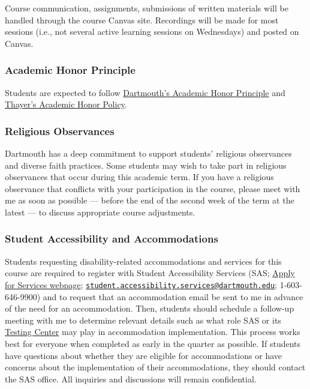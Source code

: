 \documentclass[
  11pt,
]{article}
\begin{document}
Course communication, assignments, submissions of written materials will
be handled through the course Canvas site. Recordings will be made for
most sessions (i.e., not several active learning sessions on Wednesdays)
and posted on Canvas.

\subsubsection{Academic Honor Principle}\label{academic-honor-principle}

Students are expected to follow
\href{https://policies.dartmouth.edu/policy/academic-honor-principle}{Dartmouth's
Academic Honor Principle} and
\href{https://engineering.dartmouth.edu/about/policies/student-policies/academic-honor-policy}{Thayer's
Academic Honor Policy}.

\subsubsection{Religious Observances}\label{religious-observances}

Dartmouth has a deep commitment to support students' religious
observances and diverse faith practices. Some students may wish to take
part in religious observances that occur during this academic term. If
you have a religious observance that conflicts with your participation
in the course, please meet with me as soon as possible --- before the
end of the second week of the term at the latest --- to discuss
appropriate course adjustments.

\subsubsection{Student Accessibility and
Accommodations}\label{student-accessibility-and-accommodations}

Students requesting disability-related accommodations and services for
this course are required to register with Student Accessibility Services
(SAS;
\href{https://students.dartmouth.edu/student-accessibility/students/where-start/apply-services}{Apply
for Services webpage};
\href{mailto:student.accessibility.services@dartmouth.edu}{\nolinkurl{student.accessibility.services@dartmouth.edu}};
1-603-646-9900) and to request that an accommodation email be sent to me
in advance of the need for an accommodation. Then, students should
schedule a follow-up meeting with me to determine relevant details such
as what role SAS or its
\href{https://students.dartmouth.edu/student-accessibility/services/testing-center}{Testing
Center} may play in accommodation implementation. This process works
best for everyone when completed as early in the quarter as possible. If
students have questions about whether they are eligible for
accommodations or have concerns about the implementation of their
accommodations, they should contact the SAS office. All inquiries and
discussions will remain confidential.
\end{document}
